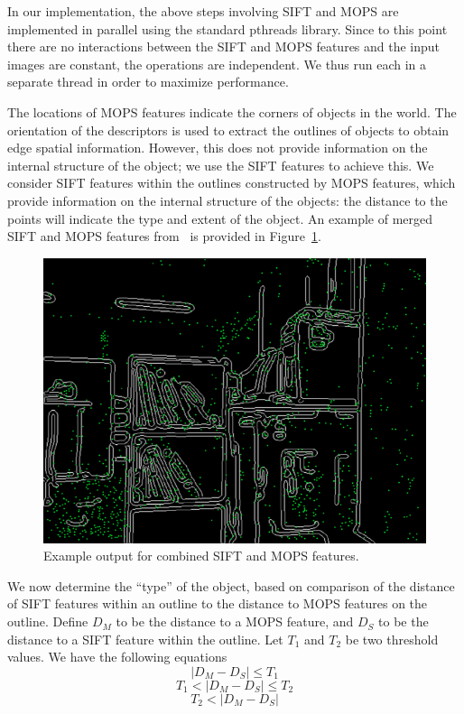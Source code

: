 \documentclass{acmsiggraph}
\begin{document}
In our implementation, the above steps involving SIFT and MOPS are implemented in parallel using the standard pthreads library. Since to this point there are no interactions between the SIFT and MOPS features and the input images are constant, the operations are independent. We thus run each in a separate thread in order to maximize performance.

The locations of MOPS features indicate the corners of objects in the world. The orientation of the descriptors is used to extract the outlines of objects to obtain edge spatial information. However, this does not provide information on the internal structure of the object; we use the SIFT features to achieve this. We consider SIFT features within the outlines constructed by MOPS features, which provide information on the internal structure of the objects: the distance to the points will indicate the type and extent of the object. An example of merged SIFT and MOPS features from~\cite{lee2011} is provided in Figure~\ref{fig:lee-sift-mops}.

\begin{figure}[h]
  \centering
  \includegraphics[resolution=150, scale=0.5]{images/lee-sift-mops-example}
  \caption{Example output for combined SIFT and MOPS features.}
  \label{fig:lee-sift-mops}
\end{figure}

We now determine the ``type'' of the object, based on comparison of the distance of SIFT features within an outline to the distance to MOPS features on the outline. Define $D_M$ to be the distance to a MOPS feature, and $D_S$ to be the distance to a SIFT feature within the outline. Let $T_1$ and $T_2$ be two threshold values. We have the following equations
\begin{equation}
  \label{eq:dist1}
  | D_M - D_S | \leq T_1
\end{equation}
\begin{equation}
  \label{eq:dist2}
  T_1 < | D_M - D_S | \leq T_2
\end{equation}
\begin{equation}
  \label{eq:dist3}
  T_2 < | D_M - D_S |
\end{equation}
\end{document}
